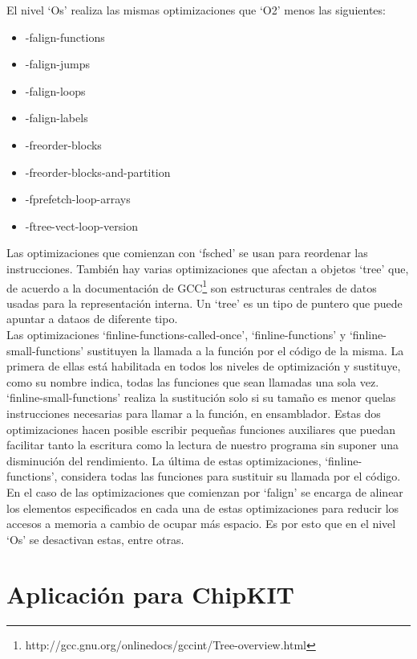 El nivel `Os' realiza las mismas optimizaciones que `O2' menos las siguientes:
\begin{multicols}{2}
\begin{itemize}[noitemsep, topsep=0pt, parsep=0pt, partopsep=0pt]
	\item -falign-functions
	\item -falign-jumps
	\item -falign-loops
	\item -falign-labels
	\item -freorder-blocks
	\item -freorder-blocks-and-partition
	\item -fprefetch-loop-arrays
	\item -ftree-vect-loop-version
\end{itemize}
\end{multicols}

Las optimizaciones que comienzan con `fsched' se usan para reordenar las instrucciones. También hay varias optimizaciones que afectan a objetos `tree' que, de acuerdo a la documentación de GCC\protect\footnote{http://gcc.gnu.org/onlinedocs/gccint/Tree-overview.html} son estructuras centrales de datos usadas para la representación interna. Un `tree' es un tipo de puntero que puede apuntar a dataos de diferente tipo.\\
Las optimizaciones `finline-functions-called-once', `finline-functions' y `finline-small-functions' sustituyen la llamada a la función por el código de la misma. La primera de ellas está habilitada en todos los niveles de optimización y sustituye, como su nombre indica, todas las funciones que sean llamadas una sola vez. `finline-small-functions' realiza la sustitución solo si su tamaño es menor quelas instrucciones necesarias para llamar a la función, en ensamblador. Estas dos optimizaciones hacen posible escribir pequeñas funciones auxiliares que puedan facilitar tanto la escritura como la lectura de nuestro programa sin suponer una disminución del rendimiento. La última de estas optimizaciones, `finline-functions', considera todas las funciones para sustituir su llamada por el código.\\
En el caso de las optimizaciones que comienzan por `falign'  se encarga de alinear los elementos especificados en cada una de estas optimizaciones para reducir los accesos a memoria a cambio de ocupar más espacio. Es por esto que en el nivel `Os' se desactivan estas, entre otras.

\section{Aplicación para ChipKIT}

